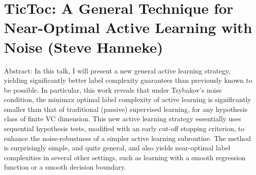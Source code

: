 \section{TicToc: A General Technique for Near-Optimal Active Learning with Noise (Steve Hanneke)}

Abstract: In this talk, I will present a new general active learning strategy, yielding significantly better label complexity guarantees than previously known to be possible. In particular, this work reveals that under Tsybakov's noise condition, the minimax optimal label complexity of active learning is significantly smaller than that of traditional (passive) supervised learning, for any hypothesis class of finite VC dimension. This new active learning strategy essentially uses sequential hypothesis tests, modified with an early cut-off stopping criterion, to enhance the noise-robustness of a simpler active learning subroutine. The method is surprisingly simple, and quite general, and also yields near-optimal label complexities in several other settings, such as learning with a smooth regression function or a smooth decision boundary.
